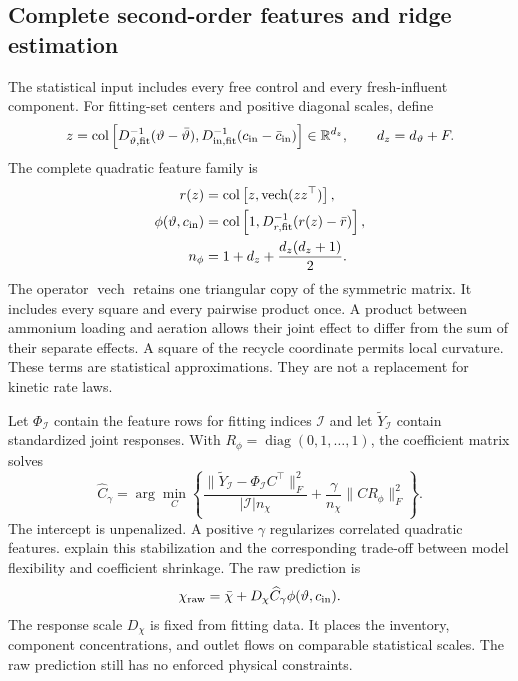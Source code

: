 \subsection{Complete second-order features and ridge estimation}

The statistical input includes every free control and every fresh-influent component. For fitting-set centers and positive diagonal scales, define
\begin{equation}
z=\operatorname{col}\left[D_{\vartheta,\rm fit}^{-1}(\vartheta-\bar\vartheta),
D_{{\rm in},\rm fit}^{-1}(c_{\rm in}-\bar c_{\rm in})\right]
\in\mathbb R^{d_z},\qquad d_z=d_\vartheta+F.
\label{eq:plant_standardized_input}
\end{equation}
The complete quadratic feature family is
\begin{align}
r(z)&=\operatorname{col}\left[z,\operatorname{vech}(zz^\top)\right],\\
\phi(\vartheta,c_{\rm in})&=\operatorname{col}\left[1,D_{r,\rm fit}^{-1}(r(z)-\bar r)\right],\\
n_\phi&=1+d_z+\frac{d_z(d_z+1)}{2}.
\label{eq:plant_features}
\end{align}
The operator $\operatorname{vech}$ retains one triangular copy of the symmetric matrix. It includes every square and every pairwise product once. A product between ammonium loading and aeration allows their joint effect to differ from the sum of their separate effects. A square of the recycle coordinate permits local curvature. These terms are statistical approximations. They are not a replacement for kinetic rate laws.

Let $\Phi_{\mathcal I}$ contain the feature rows for fitting indices $\mathcal I$ and let $\widetilde Y_{\mathcal I}$ contain standardized joint responses. With $R_\phi=\operatorname{diag}(0,1,\ldots,1)$, the coefficient matrix solves
\begin{equation}
\widehat C_\gamma=\arg\min_C
\left\{\frac{\|\widetilde Y_{\mathcal I}-\Phi_{\mathcal I}C^\top\|_F^2}
{|\mathcal I|n_\chi}+\frac{\gamma}{n_\chi}\|CR_\phi\|_F^2\right\}.
\label{eq:plant_ridge_fit}
\end{equation}
The intercept is unpenalized. A positive $\gamma$ regularizes correlated quadratic features. \citet{Hastie2009} explain this stabilization and the corresponding trade-off between model flexibility and coefficient shrinkage. The raw prediction is
\begin{equation}
\chi_{\rm raw}=\bar\chi+D_\chi\widehat C_\gamma\phi(\vartheta,c_{\rm in}).
\label{eq:plant_raw_prediction}
\end{equation}
The response scale $D_\chi$ is fixed from fitting data. It places the inventory, component concentrations, and outlet flows on comparable statistical scales. The raw prediction still has no enforced physical constraints.

